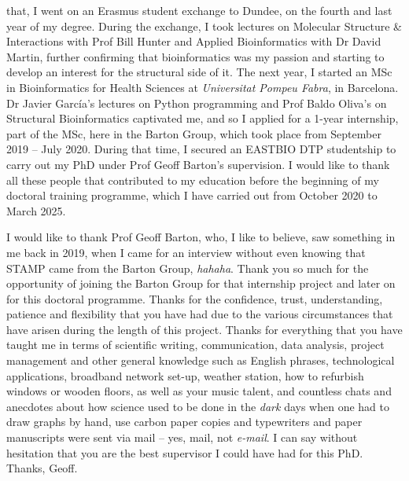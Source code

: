 that, I went on an Erasmus student exchange to Dundee, on the fourth and last year of my degree. During the exchange, I took lectures on Molecular Structure \& Interactions with Prof Bill Hunter and Applied Bioinformatics with Dr David Martin, further confirming that bioinformatics was my passion and starting to develop an interest for the structural side of it. The next year, I started an MSc in Bioinformatics for Health Sciences at \textit{Universitat Pompeu Fabra}, in Barcelona. Dr Javier García's lectures on Python programming and Prof Baldo Oliva's on Structural Bioinformatics captivated me, and so I applied for a 1-year internship, part of the MSc, here in the Barton Group, which took place from September 2019 -- July 2020. During that time, I secured an EASTBIO DTP studentship to carry out my PhD under Prof Geoff Barton's supervision. I would like to thank all these people that contributed to my education before the beginning of my doctoral training programme, which I have carried out from October 2020 to March 2025.

I would like to thank Prof Geoff Barton, who, I like to believe, saw something in me back in 2019, when I came for an interview without even knowing that STAMP came from the Barton Group, \textit{hahaha}. Thank you so much for the opportunity of joining the Barton Group for that internship project and later on for this doctoral programme. Thanks for the confidence, trust, understanding, patience and flexibility that you have had due to the various circumstances that have arisen during the length of this project. Thanks for everything that you have taught me in terms of scientific writing, communication, data analysis, project management and other general knowledge such as English phrases, technological applications, broadband network set-up, weather station, how to refurbish windows or wooden floors, as well as your music talent, and countless chats and anecdotes about how science used to be done in the \textit{dark} days when one had to draw graphs by hand, use carbon paper copies and typewriters and paper manuscripts were sent via mail -- yes, mail, not \textit{e-mail}. I can say without hesitation that you are the best supervisor I could have had for this PhD. Thanks, Geoff.

